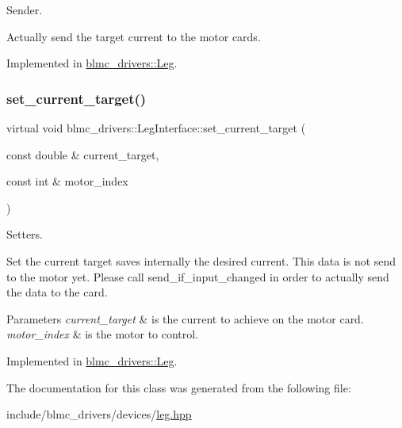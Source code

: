 Sender. 

Actually send the target current to the motor cards. 

Implemented in \hyperlink{classblmc__drivers_1_1Leg_a82bb681e4c5047babf699cff559e9488}{blmc\+\_\+drivers\+::\+Leg}.

\mbox{\label{classblmc__drivers_1_1LegInterface_a6917a158f12589c9ee6aa45304fdafce}} 
\subsubsection{\texorpdfstring{set\+\_\+current\+\_\+target()}{set\_current\_target()}}
{\footnotesize\ttfamily virtual void blmc\+\_\+drivers\+::\+Leg\+Interface\+::set\+\_\+current\+\_\+target (\begin{DoxyParamCaption}\item[{const double \&}]{current\+\_\+target,  }\item[{const int \&}]{motor\+\_\+index }\end{DoxyParamCaption})\hspace{0.3cm}{\ttfamily [pure virtual]}}



Setters. 

Set the current target saves internally the desired current. This data is not send to the motor yet. Please call send\+\_\+if\+\_\+input\+\_\+changed in order to actually send the data to the card.


\begin{DoxyParams}{Parameters}
{\em current\+\_\+target} & is the current to achieve on the motor card. \\
\hline
{\em motor\+\_\+index} & is the motor to control. \\
\hline
\end{DoxyParams}


Implemented in \hyperlink{classblmc__drivers_1_1Leg_a05415969ef111f86837b34bdaecb7320}{blmc\+\_\+drivers\+::\+Leg}.



The documentation for this class was generated from the following file\+:\begin{DoxyCompactItemize}
\item 
include/blmc\+\_\+drivers/devices/\hyperlink{leg_8hpp}{leg.\+hpp}\end{DoxyCompactItemize}
